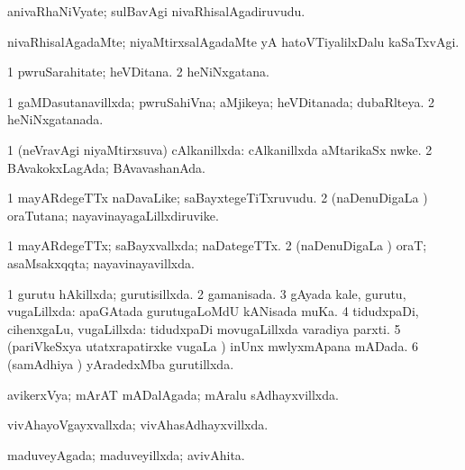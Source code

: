 {{\bentry
{} 
\gl{\nA}
\expl{}
\bmng
anivaRhaNiVyate; sulBavAgi nivaRhisalAgadiruvudu. 
\emng
\eentry

\bentry
{} 
\gl{\kirxvi}
\expl{}
\bmng
nivaRhisalAgadaMte; niyaMtirxsalAgadaMte yA hatoVTiyalilxDalu kaSaTxvAgi. 
\emng
\eentry

\bentry
{} 
\gl{\nA}
\expl{}
\bmng
\bnum
\num{1} pwruSarahitate; heVDitana. 
\num{2} heNiNxgatana. 
\enum
\emng
\eentry

\bentry
{} 
\gl{\gu}
\expl{}
\bmng
\bnum
\num{1} gaMDasutanavillxda; pwruSahiVna; aMjikeya; heVDitanada; dubaRlteya. 
\num{2} heNiNxgatanada. 
\enum
\emng
\eentry

\bentry
{} 
\gl{\gu}
\expl{}
\bmng
\bnum
\num{1} (neVravAgi niyaMtirxsuva) cAlkanillxda:  cAlkanillxda aMtarikaSx nwke. 
\num{2} BAvakokxLagAda; BAvavashanAda. 
\enum
\emng
\eentry

\bentry
{} 
\gl{\nA}
\expl{}
\bmng
\bnum
\num{1} mayARdegeTTx naDavaLike; saBayxtegeTiTxruvudu. 
\num{2} (naDenuDigaLa \vi) oraTutana; nayavinayagaLillxdiruvike. 
\enum
\emng
\eentry

\bentry
{} 
\gl{\gu}
\expl{}
\bmng
\bnum
\num{1} mayARdegeTTx; saBayxvallxda; naDategeTTx. 
\num{2} (naDenuDigaLa \vi) oraT; asaMsakxqqta; nayavinayavillxda. 
\enum
\emng
\eentry

\bentry
{} 
\gl{\gu}
\expl{}
\bmng
\bnum
\num{1} gurutu hAkillxda; gurutisillxda. 
\num{2} gamanisada. 
\num{3} gAyada kale, gurutu, \mo vugaLillxda:  apaGAtada gurutugaLoMdU kANisada muKa. 
\num{4} tidudxpaDi, cihenxgaLu, \mo vugaLillxda:  tidudxpaDi movugaLillxda varadiya parxti. 
\num{5} (pariVkeSxya utatxrapatirxke \mo vugaLa \vi) inUnx mwlyxmApana mADada. 
\num{6} (samAdhiya \vi) yAradedxMba gurutillxda. 
\enum
\emng
\eentry

\bentry
{} 
\gl{\gu}
\expl{}
\bmng
avikerxVya; mArAT mADalAgada; mAralu sAdhayxvillxda. 
\emng
\eentry

\bentry
{} 
\gl{\gu}
\expl{}
\bmng
vivAhayoVgayxvallxda; vivAhasAdhayxvillxda. 
\emng
\eentry

\bentry
{} 
\gl{\gu}
\expl{}
\bmng
maduveyAgada; maduveyillxda; avivAhita. 
\emng
\eentry

}}
